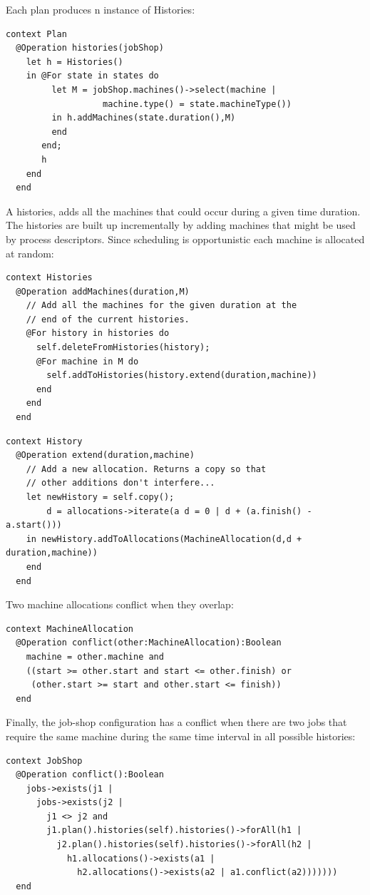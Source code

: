 Each plan produces n instance of Histories:

\begin{lstlisting}
context Plan
  @Operation histories(jobShop)
    let h = Histories()
    in @For state in states do
         let M = jobShop.machines()->select(machine | 
                   machine.type() = state.machineType())
         in h.addMachines(state.duration(),M)
         end
       end;
       h
    end
  end
\end{lstlisting}A histories, adds all the machines that could occur during a given
time duration. The histories are built up incrementally by adding
machines that might be used by process descriptors. Since scheduling
is opportunistic each machine is allocated at random:

\begin{lstlisting}
context Histories
  @Operation addMachines(duration,M)
    // Add all the machines for the given duration at the
    // end of the current histories.
    @For history in histories do
      self.deleteFromHistories(history);
      @For machine in M do
        self.addToHistories(history.extend(duration,machine))
      end
    end
  end
\end{lstlisting}\begin{lstlisting}
context History
  @Operation extend(duration,machine)
    // Add a new allocation. Returns a copy so that
    // other additions don't interfere...
    let newHistory = self.copy();
        d = allocations->iterate(a d = 0 | d + (a.finish() - a.start()))
    in newHistory.addToAllocations(MachineAllocation(d,d + duration,machine))
    end
  end
\end{lstlisting}Two machine allocations conflict when they overlap:

\begin{lstlisting}
context MachineAllocation
  @Operation conflict(other:MachineAllocation):Boolean
    machine = other.machine and
    ((start >= other.start and start <= other.finish) or
     (other.start >= start and other.start <= finish))
  end
\end{lstlisting}Finally, the job-shop configuration has a conflict when there are
two jobs that require the same machine during the same time interval
in all possible histories:

\begin{lstlisting}
context JobShop
  @Operation conflict():Boolean
    jobs->exists(j1 |
      jobs->exists(j2 |
        j1 <> j2 and
        j1.plan().histories(self).histories()->forAll(h1 |
          j2.plan().histories(self).histories()->forAll(h2 |
            h1.allocations()->exists(a1 |
              h2.allocations()->exists(a2 | a1.conflict(a2)))))))
  end
\end{lstlisting}
